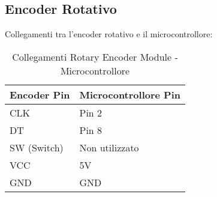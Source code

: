 \documentclass[a4paper, 12pt]{article}
\begin{document}
\subsection{Encoder Rotativo}
\label{subsec:setup-encoder}
Collegamenti tra l'encoder rotativo e il microcontrollore:

\begin{table}[H]
    \centering
    \caption{Collegamenti Rotary Encoder Module - Microcontrollore}
    \label{tab:rotary-encoder-connections}
    \begin{tabular}{ll}
        \toprule
        \textbf{Encoder Pin} & \textbf{Microcontrollore Pin} \\
        \midrule
        CLK                  & Pin 2                         \\
        DT                   & Pin 8                         \\
        SW (Switch)          & Non utilizzato                \\
        VCC                  & 5V                            \\
        GND                  & GND                           \\
        \bottomrule
    \end{tabular}
\end{table}

\end{document}
